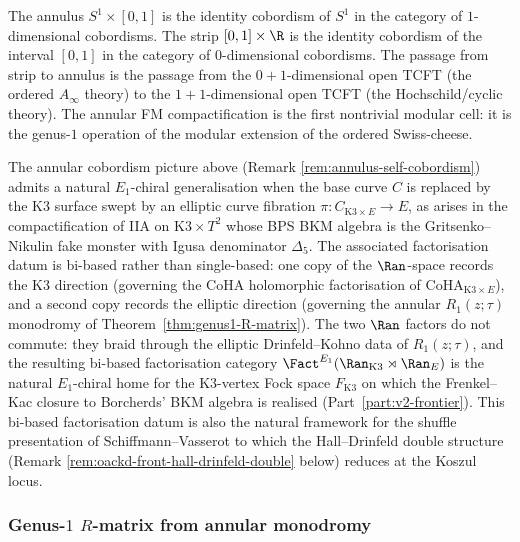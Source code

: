 \begin{remark}
\label{rem:annulus-self-cobordism}
The annulus $S^1 \times [0,1]$ is the identity cobordism of $S^1$
in the category of $1$-dimensional cobordisms. The strip
$[0,1] \times \R$ is the identity cobordism of the interval $[0,1]$
in the category of $0$-dimensional cobordisms. The passage from
strip to annulus is the passage from the $0{+}1$-dimensional open
TCFT (the ordered $A_\infty$ theory) to the $1{+}1$-dimensional open
TCFT (the Hochschild/cyclic theory). The annular FM
compactification is the first nontrivial modular cell: it is the
genus-$1$ operation of the modular extension of the ordered
Swiss-cheese.
\end{remark}

\begin{remark}
\label{rem:oackd-front-bi-based-ran}
%
%
%
The annular cobordism picture above (Remark
\ref{rem:annulus-self-cobordism}) admits a natural $E_1$-chiral
generalisation when the base curve $C$ is replaced by the K3
surface swept by an elliptic curve fibration
$\pi\colon C_{\mathrm{K3}\times E} \to E$, as arises in the
compactification of IIA on $\mathrm{K3}\times T^2$ whose BPS
BKM algebra is the Gritsenko--Nikulin fake monster with
Igusa denominator $\Delta_5$. The associated factorisation
datum is bi-based rather than single-based: one copy of the
$\Ran$-space records the K3 direction (governing the CoHA
holomorphic factorisation of $\mathrm{CoHA}_{\mathrm{K3}\times E}$),
and a second copy records the elliptic direction (governing
the annular $R_1(z;\tau)$ monodromy of
Theorem~\ref{thm:genus1-R-matrix}). The two
$\Ran$ factors do not commute: they braid through the
elliptic Drinfeld--Kohno data of $R_1(z;\tau)$, and the
resulting bi-based factorisation category
$\Fact^{E_1}(\Ran_{\mathrm{K3}} \rtimes \Ran_E)$ is the natural
$E_1$-chiral home for the K3-vertex Fock space $F_{\mathrm{K3}}$
on which the Frenkel--Kac closure to Borcherds' BKM algebra is
realised (Part~\ref{part:v2-frontier}). This bi-based
factorisation datum is also the natural framework for the
shuffle presentation of Schiffmann--Vasserot to which the
Hall--Drinfeld double structure (Remark
\ref{rem:oackd-front-hall-drinfeld-double} below) reduces
at the Koszul locus.
\end{remark}

\subsubsection{Genus-$1$ $R$-matrix from annular monodromy}

